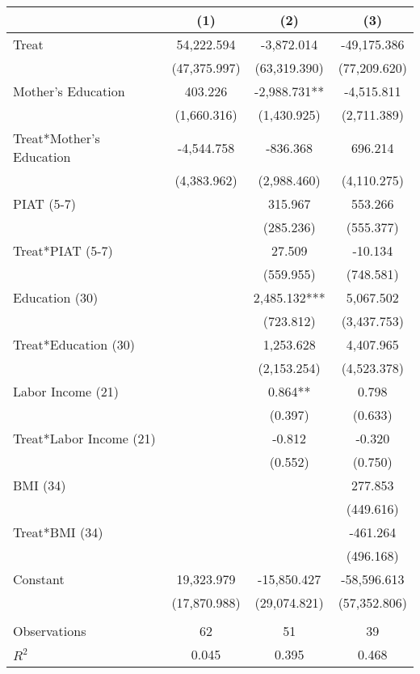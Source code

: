 \begin{tabular}{lccc} \toprule
 & (1) & (2) & (3) \\ \midrule
Treat & 54,222.594 & -3,872.014 & -49,175.386 \\
 & (47,375.997) & (63,319.390) & (77,209.620) \\
Mother's Education & 403.226 & -2,988.731** & -4,515.811 \\
 & (1,660.316) & (1,430.925) & (2,711.389) \\
Treat*Mother's Education & -4,544.758 & -836.368 & 696.214 \\
 & (4,383.962) & (2,988.460) & (4,110.275) \\
PIAT (5-7) &  & 315.967 & 553.266 \\
 &  & (285.236) & (555.377) \\
Treat*PIAT (5-7) &  & 27.509 & -10.134 \\
 &  & (559.955) & (748.581) \\
Education (30) &  & 2,485.132*** & 5,067.502 \\
 &  & (723.812) & (3,437.753) \\
Treat*Education (30) &  & 1,253.628 & 4,407.965 \\
 &  & (2,153.254) & (4,523.378) \\
Labor Income (21) &  & 0.864** & 0.798 \\
 &  & (0.397) & (0.633) \\
Treat*Labor Income (21) &  & -0.812 & -0.320 \\
 &  & (0.552) & (0.750) \\
BMI (34) &  &  & 277.853 \\
 &  &  & (449.616) \\
Treat*BMI (34) &  &  & -461.264 \\
 &  &  & (496.168) \\
Constant & 19,323.979 & -15,850.427 & -58,596.613 \\
 & (17,870.988) & (29,074.821) & (57,352.806) \\ \\ \midrule
 Observations & 62 & 51 & 39 \\
$R^2$ & 0.045 & 0.395 & 0.468 \\ \bottomrule
\end{tabular}
